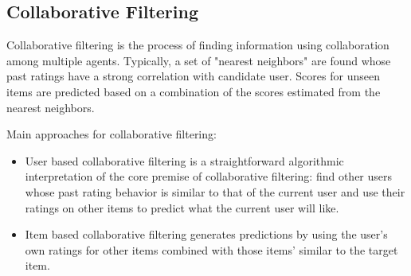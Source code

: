 \subsection{Collaborative Filtering}
 Collaborative filtering is the process of finding information using collaboration among multiple agents. Typically, a set of "nearest neighbors" are found whose past ratings have a strong correlation with candidate user. Scores for unseen items are predicted based on a combination of the scores estimated from the nearest neighbors.

Main approaches for collaborative filtering:
\begin{itemize}
\item User based collaborative filtering  is a straightforward algorithmic interpretation of the core premise of collaborative filtering: find other users whose past rating behavior is similar to that of the current user and use their ratings on other items to predict what the current user will like.
\end{itemize}
\begin{itemize}
\item Item based collaborative filtering generates predictions by using the user’s own ratings for other items combined with those items’ similar to the target item.
\end{itemize}


